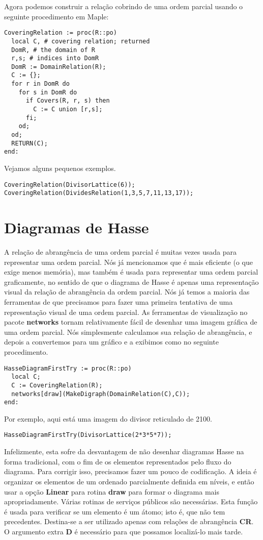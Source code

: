 \documentclass[a4paper]{article}
\begin{document}
Agora podemos construir a relação cobrindo de uma ordem parcial usando o seguinte procedimento em Maple:

\begin{lstlisting}
CoveringRelation := proc(R::po)
  local C, # covering relation; returned
  DomR, # the domain of R
  r,s; # indices into DomR
  DomR := DomainRelation(R);
  C := {};
  for r in DomR do
    for s in DomR do
      if Covers(R, r, s) then
        C := C union [r,s];
      fi;
    od;
  od;
  RETURN(C);
end:
\end{lstlisting}

Vejamos alguns pequenos exemplos.

\begin{lstlisting}
CoveringRelation(DivisorLattice(6));
CoveringRelation(DividesRelation(1,3,5,7,11,13,17));
\end{lstlisting}

\section{Diagramas de Hasse}
A relação de abrangência de uma ordem parcial é muitas vezes usada para representar uma ordem parcial. Nós já mencionamos que é mais eficiente (o que exige menos memória), mas também é usada para representar uma ordem parcial graficamente, no sentido de que o diagrama de Hasse é apenas uma representação visual da relação de abrangência da ordem parcial. Nós já temos a maioria das ferramentas de que precisamos para fazer uma primeira tentativa de uma representação visual de uma ordem parcial. As ferramentas de visualização no pacote \textbf{networks} tornam relativamente fácil de desenhar uma imagem gráfica de uma ordem parcial. Nós simplesmente calculamos sua relação de abrangência, e depois a convertemos para um gráfico e a exibimos como no seguinte procedimento.

\begin{lstlisting}
HasseDiagramFirstTry := proc(R::po)
  local C;
  C := CoveringRelation(R);
  networks[draw](MakeDigraph(DomainRelation(C),C));
end:
\end{lstlisting}

Por exemplo, aqui está uma imagem do divisor reticulado de 2100.

\begin{lstlisting}
HasseDiagramFirstTry(DivisorLattice(2*3*5*7));
\end{lstlisting}

Infelizmente, esta sofre da desvantagem de não desenhar diagramas Hasse na forma tradicional, com o fim de os elementos representados pelo fluxo do diagrama. Para corrigir isso, precisamos fazer um pouco de codificação. A ideia é organizar os elementos de um ordenado parcialmente definida em níveis, e então usar a opção \textbf{Linear} para rotina \textbf{draw} para formar o diagrama mais apropriadamente. Várias rotinas de serviços públicos são necessárias. Esta função é usada para verificar se um elemento é um átomo; isto é, que não tem precedentes. Destina-se a ser utilizado apenas com relações de abrangência \textbf{CR}. O argumento extra \textbf{D} é necessário para que possamos localizá-lo mais tarde.
\end{document}
